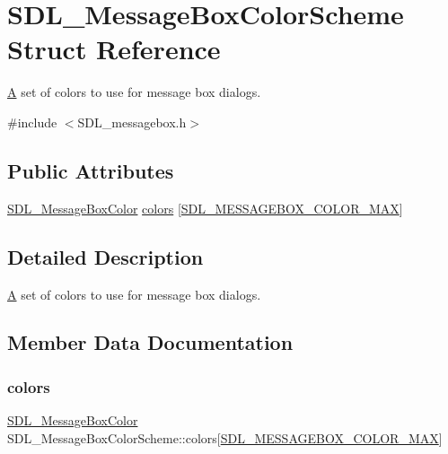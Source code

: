\hypertarget{struct_s_d_l___message_box_color_scheme}{}\section{S\+D\+L\+\_\+\+Message\+Box\+Color\+Scheme Struct Reference}
\label{struct_s_d_l___message_box_color_scheme}


\mbox{\hyperlink{struct_a}{A}} set of colors to use for message box dialogs.  




{\ttfamily \#include $<$S\+D\+L\+\_\+messagebox.\+h$>$}

\subsection*{Public Attributes}
\begin{DoxyCompactItemize}
\item 
\mbox{\hyperlink{struct_s_d_l___message_box_color}{S\+D\+L\+\_\+\+Message\+Box\+Color}} \mbox{\hyperlink{struct_s_d_l___message_box_color_scheme_ae3712ec81e41b63b781b7d49d3b3b8f6}{colors}} \mbox{[}\mbox{\hyperlink{_s_d_l__messagebox_8h_a75e562d38bc214725e01f4f829bc1567a0a575b056603e38e844b141c83a44d89}{S\+D\+L\+\_\+\+M\+E\+S\+S\+A\+G\+E\+B\+O\+X\+\_\+\+C\+O\+L\+O\+R\+\_\+\+M\+AX}}\mbox{]}
\end{DoxyCompactItemize}


\subsection{Detailed Description}
\mbox{\hyperlink{struct_a}{A}} set of colors to use for message box dialogs. 

\subsection{Member Data Documentation}
\mbox{\label{struct_s_d_l___message_box_color_scheme_ae3712ec81e41b63b781b7d49d3b3b8f6}} 
\subsubsection{\texorpdfstring{colors}{colors}}
{\footnotesize\ttfamily \mbox{\hyperlink{struct_s_d_l___message_box_color}{S\+D\+L\+\_\+\+Message\+Box\+Color}} S\+D\+L\+\_\+\+Message\+Box\+Color\+Scheme\+::colors\mbox{[}\mbox{\hyperlink{_s_d_l__messagebox_8h_a75e562d38bc214725e01f4f829bc1567a0a575b056603e38e844b141c83a44d89}{S\+D\+L\+\_\+\+M\+E\+S\+S\+A\+G\+E\+B\+O\+X\+\_\+\+C\+O\+L\+O\+R\+\_\+\+M\+AX}}\mbox{]}}



